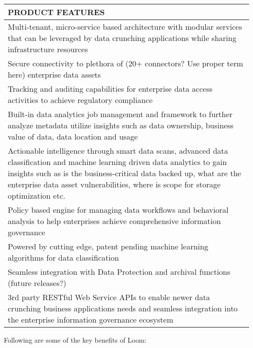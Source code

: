 \documentclass[letterpaper,10pt,english]{sphinxhowto}
\begin{document}
\begin{savenotes}\sphinxattablestart
\centering
\begin{tabulary}{\linewidth}[t]{|T|}
\hline

PRODUCT FEATURES
\\
\hline
Multi-tenant, micro-service based architecture with modular services that can be
leveraged by data crunching applications while sharing infrastructure resources
\\
\hline
Secure connectivity to plethora of (20+ connectors? Use proper term here) enterprise
data assets
\\
\hline
Tracking and auditing capabilities for enterprise data access activities to achieve
regulatory compliance
\\
\hline
Built-in data analytics job management and framework to further analyze metadata
utilize insights such as data ownership, business value of data, data location and
usage
\\
\hline
Actionable intelligence through smart data scans, advanced data classification and
machine learning driven data analytics to gain insights such as \textendash{} is the
business-critical data backed up, what are the enterprise data asset
vulnerabilities, where is scope for storage optimization etc.
\\
\hline
Policy based engine for managing data workflows and behavioral analysis to help
enterprises achieve comprehensive information governance
\\
\hline
Powered by cutting edge, patent pending machine learning algorithms for
data classification
\\
\hline
Seamless integration with Data Protection and archival functions (future releases?)
\\
\hline
3rd party RESTful Web Service APIs to enable newer data crunching business
applications needs and seamless integration into the enterprise information
governance ecosystem
\\
\hline
\end{tabulary}
\par
\sphinxattableend\end{savenotes}

Following are some of the key benefits of Loom:
\end{document}

